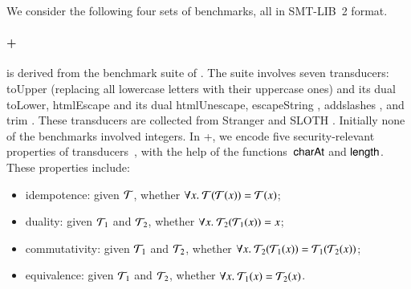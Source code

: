 %
%
% 

We consider the following four sets of benchmarks, all in SMT-LIB~2 format.

\paragraph*{\transducerbench+}

is derived from the {\transducerbench} benchmark suite of {\ostrich}
\cite{CHL+19}.  The {\transducerbench} suite involves seven
transducers: toUpper (replacing all lowercase letters with their
uppercase ones) and its dual toLower, htmlEscape \cite{htmlEscape} and
its dual htmlUnescape, escapeString \cite{escapeString}, addslashes
\cite{addslashes}, and trim \cite{trim}. These transducers are
collected from Stranger \cite{YABI14} and SLOTH
\cite{HJLRV18}. Initially none of the benchmarks involved integers. In
{\transducerbench+}, we encode five security-relevant properties of
transducers~\cite{BEK}, with the help of the functions~$\mathsf{charAt}$ and
$\mathsf{length}$. These properties include:
\begin{itemize}
\item idempotence: given $\mathcal{T}$, whether
  $\forall x.\ \mathcal{T}(\mathcal{T}(x)) = \mathcal{T}(x)$;
\item duality: given $\mathcal{T}_1$ and
  $\mathcal{T}_2$, whether $\forall x.\ \mathcal{T}_2(\mathcal{T}_1(x)) = x$;
\item commutativity: given $\mathcal{T}_1$ and $\mathcal{T}_2$, whether
  $\forall x.\ \mathcal{T}_2(\mathcal{T}_1(x)) = \mathcal{T}_1(\mathcal{T}_2(x))$;
\item equivalence: given $\mathcal{T}_1$ and $\mathcal{T}_2$, whether
  $\forall x.\ \mathcal{T}_1(x) = \mathcal{T}_2(x)$.
\end{itemize}

